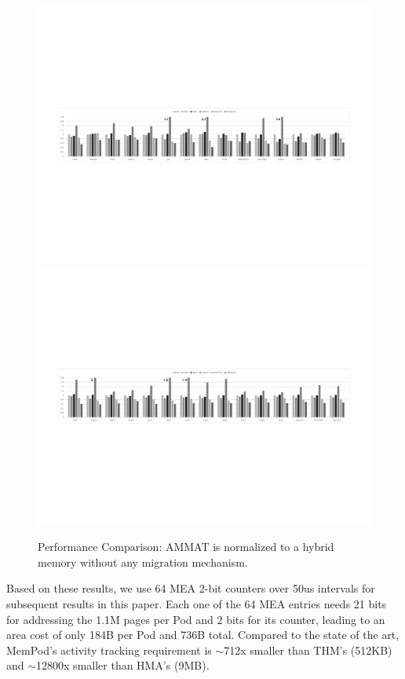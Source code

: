 \begin{figure}[t]
  \includegraphics[width=\textwidth]{figures/revised/new/comparison_no_cache_a.pdf}
  \includegraphics[width=\textwidth]{figures/revised/new/comparison_no_cache_b.pdf}
  \caption{Performance Comparison: AMMAT is normalized to a hybrid memory without any migration mechanism.}
  \label{fig:performance}
\end{figure}

Based on these results, we use 64 MEA 2-bit counters over 50us intervals
for subsequent results in this paper.
Each one of the 64 MEA entries needs 21 bits for addressing the 1.1M pages per Pod and 2 bits for its counter, leading to an area cost of only 184B per Pod and 736B total. Compared to the state of the art, MemPod's activity tracking requirement is $\sim$712x smaller than THM's (512KB) and $\sim$12800x smaller than HMA's (9MB).



